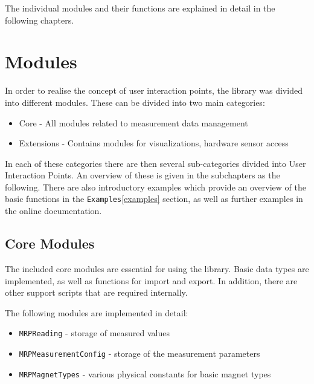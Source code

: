 The individual modules and their functions are explained in detail in
the following chapters.

\hypertarget{modules}{%
\section{Modules}\label{modules}}

In order to realise the concept of user interaction points, the library
was divided into different modules. These can be divided into two main
categories:

\begin{itemize}
\tightlist
\item
  Core - All modules related to measurement data management
\item
  Extensions - Contains modules for visualizations, hardware sensor
  access
\end{itemize}

In each of these categories there are then several sub-categories
divided into User Interaction Points. An overview of these is given in
the subchapters as the following. There are also introductory examples
which provide an overview of the basic functions in the
\passthrough{\lstinline!Examples!}\ref{examples} section, as well as
further examples in the online
documentation\cite{MagneticReadoutProcessingReadTheDocs}.

\hypertarget{core-modules}{%
\subsection{Core Modules}\label{core-modules}}

The included core modules are essential for using the library. Basic
data types are implemented, as well as functions for import and export.
In addition, there are other support scripts that are required
internally.

The following modules are implemented in detail:

\begin{itemize}
\tightlist
\item
  \passthrough{\lstinline!MRPReading!} - storage of measured values
\item
  \passthrough{\lstinline!MRPMeasurementConfig!} - storage of the
  measurement parameters
\item
  \passthrough{\lstinline!MRPMagnetTypes!} - various physical constants
  for basic magnet types
\end{itemize}

